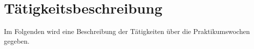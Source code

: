 

\chapter{Tätigkeitsbeschreibung} \label{ch:wochenberichte-shortened}

Im Folgenden wird eine Beschreibung der Tätigkeiten über die Praktikumswochen gegeben.





































%


%


%

